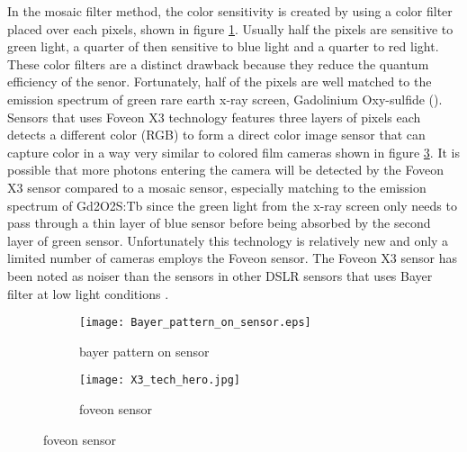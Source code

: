 In the mosaic filter method, the color sensitivity is created by using a color filter placed over each pixels, shown in figure \ref{fig:bayer_pattern_on_sensor}.  Usually half the pixels are sensitive to green light, a quarter of then sensitive to blue light and a quarter to red light.  These color filters are a distinct drawback because they reduce the quantum efficiency of the senor.  Fortunately, half of the pixels are well matched to the emission spectrum of green rare earth x-ray screen, Gadolinium Oxy-sulfide ().  Sensors that uses Foveon X3 technology features three layers of pixels each detects a different color (RGB) to form a direct color image sensor that can capture color in a way very similar to colored film cameras shown in figure \ref{fig:foveon_sensor}.  It is possible that more photons entering the camera will be detected by the Foveon X3 sensor compared to a mosaic sensor, especially matching to the emission spectrum of Gd2O2S:Tb since the green light from the x-ray screen only needs to pass through a thin layer of blue sensor before being absorbed by the second layer of green sensor.  Unfortunately this technology is relatively new and only a limited number of cameras employs the Foveon sensor.  The Foveon X3 sensor has been noted as noiser than the sensors in other DSLR sensors that uses Bayer filter at low light conditions \cite{sigmasd10} \cite{stevesdigicams}.

\begin{figure}[ht]
	\begin{subfigure}[b]{0.4\linewidth}
		\centering
		\texttt{[image: Bayer\_pattern\_on\_sensor.eps]}
		\caption{bayer pattern on sensor}
		\label{fig:bayer_pattern_on_sensor}
	\end{subfigure}
	\hspace{0.5cm}
	\begin{subfigure}[b]{0.4\linewidth}
		\centering
		\texttt{[image: X3\_tech\_hero.jpg]}
		\caption{foveon sensor}
		\label{fig:foveon_sensor}
	\end{subfigure}
\end{figure}

